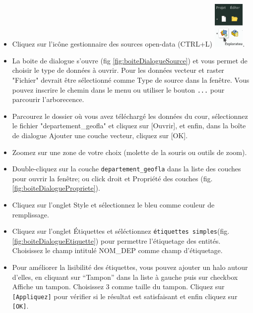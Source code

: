 \documentclass[a4paper, 11pt]{article}
\begin{document}
  \begin{itemize}
    \item Cliquez sur l’icône gestionnaire des sources open-data (CTRL+L) \includegraphics[width=1.5cm]{img/qgis_gestionnaire_de_sources}.
    \item La boite de dialogue s'ouvre (fig \ref{fig:boiteDialogueSource}) et vous permet de choisir le type de données à ouvrir. Pour les données vecteur et raster  "Fichier" devrait être sélectionné comme Type de source dans la fenêtre. Vous pouvez inscrire le chemin dans le menu ou utiliser le bouton \texttt{...} pour parcourir l'arborecence.
    \item Parcourez le dossier où vous avez téléchargé les données du cour, sélectionnez le fichier "departement\_geofla" et cliquez sur [Ouvrir], et enfin, dans la boîte de dialogue Ajouter une couche vecteur, cliquez sur [OK].
    \item Zoomez sur une zone de votre choix (molette de la souris ou outils de zoom).
    \item Double-cliquez sur la couche \texttt{departement\_geofla} dans la liste des couches pour ouvrir la fenêtre; ou click droit et Propriété des couches (fig. \ref{fig:boiteDialoguePropriete}).
    \item Cliquez sur l’onglet Style et sélectionnez le bleu comme couleur de remplissage.
    \item Cliquez sur l’onglet Étiquettes et séléctionnez \texttt{étiquettes simples}(fig. \ref{fig:boiteDialogueEtiquette}) pour permettre l’étiquetage des entités. Choisissez le champ intitulé NOM\_DEP comme champ d’étiquetage.
    \item Pour améliorer la lisibilité des étiquettes, vous pouvez ajouter un halo autour d’elles, en cliquant sur “Tampon” dans la liste à gauche puis sur checkbox Affiche un tampon. Choisissez 3 comme taille du tampon.
    Cliquez sur \texttt{[Appliquez]} pour vérifier si le résultat est satisfaisant et enfin cliquez sur \texttt{[OK]}.
  \end{itemize}
\end{document}
